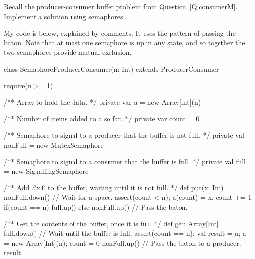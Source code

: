\begin{questionS}
Recall the producer-consumer buffer problem from
Question~\ref{Q:consumerM}.  Implement a solution using semaphores.
\end{questionS}


\begin{answerS}
My code is below, explained by comments.  It uses the pattern of passing the
baton.  Note that at most one semaphore is up in any state, and so together
the two semaphores provide mutual exclusion. 
%
\begin{scala}
class SemaphoreProducerConsumer(n: Int) extends ProducerConsumer{
  require(n >= 1)

  /** Array to hold the data. */
  private var a = new Array[Int](n)

  /** Number of items added to a so far. */
  private var count = 0

  /** Semaphore to signal to a producer that the buffer is not full. */
  private val nonFull = new MutexSemaphore

  /** Semaphore to signal to a consumer that the buffer is full. */
  private val full = new SignallingSemaphore

  /** Add £x£ to the buffer, waiting until it is not full. */
  def put(x: Int) = {
    nonFull.down() // Wait for a space.
    assert(count < n); a(count) = x; count += 1
    if(count == n) full.up() else nonFull.up() // Pass the baton.
  }

  /** Get the contents of the buffer, once it is full. */
  def get: Array[Int] = {
    full.down() // Wait until the buffer is full.
    assert(count == n); val result = a; a = new Array[Int](n); count = 0
    nonFull.up() // Pass the baton to a producer.
    result
  }
}
\end{scala}
\end{answerS}
